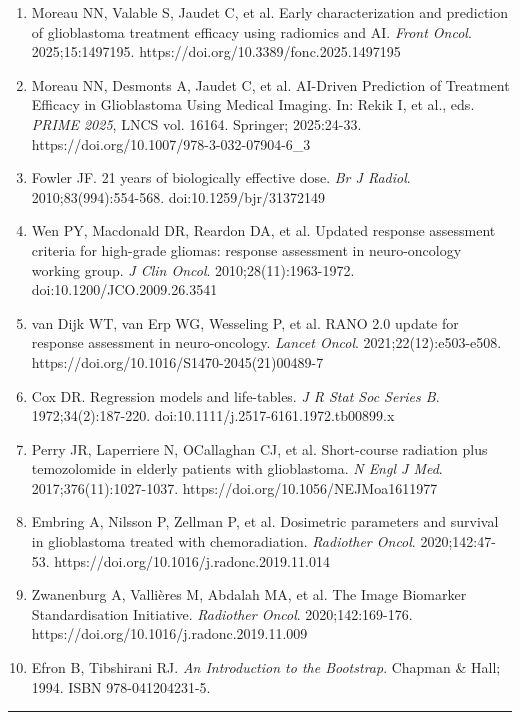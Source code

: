 \documentclass[
  11pt,
]{article}
\begin{document}
\begin{enumerate}
  and radiotherapy plans of patients with glioblastoma: the CFB-GBM
  cohort (Version 3). \emph{The Cancer Imaging Archive}. 2025.
  https://doi.org/10.7937/v9pn-2f72
\item
  Moreau NN, Valable S, Jaudet C, et al. Early characterization and
  prediction of glioblastoma treatment efficacy using radiomics and AI.
  \emph{Front Oncol}. 2025;15:1497195.
  https://doi.org/10.3389/fonc.2025.1497195
\item
  Moreau NN, Desmonts A, Jaudet C, et al. AI-Driven Prediction of
  Treatment Efficacy in Glioblastoma Using Medical Imaging. In: Rekik I,
  et al., eds. \emph{PRIME 2025}, LNCS vol. 16164. Springer; 2025:24-33.
  https://doi.org/10.1007/978-3-032-07904-6\_3
\item
  Fowler JF. 21 years of biologically effective dose. \emph{Br J
  Radiol}. 2010;83(994):554-568. doi:10.1259/bjr/31372149
\item
  Wen PY, Macdonald DR, Reardon DA, et al. Updated response assessment
  criteria for high-grade gliomas: response assessment in neuro-oncology
  working group. \emph{J Clin Oncol}. 2010;28(11):1963-1972.
  doi:10.1200/JCO.2009.26.3541
\item
  van Dijk WT, van Erp WG, Wesseling P, et al. RANO 2.0 update for
  response assessment in neuro-oncology. \emph{Lancet Oncol}.
  2021;22(12):e503-e508. https://doi.org/10.1016/S1470-2045(21)00489-7
\item
  Cox DR. Regression models and life-tables. \emph{J R Stat Soc Series
  B}. 1972;34(2):187-220. doi:10.1111/j.2517-6161.1972.tb00899.x
\item
  Perry JR, Laperriere N, O\textquotesingle Callaghan CJ, et al.
  Short-course radiation plus temozolomide in elderly patients with
  glioblastoma. \emph{N Engl J Med}. 2017;376(11):1027-1037.
  https://doi.org/10.1056/NEJMoa1611977
\item
  Embring A, Nilsson P, Zellman P, et al. Dosimetric parameters and
  survival in glioblastoma treated with chemoradiation. \emph{Radiother
  Oncol}. 2020;142:47-53. https://doi.org/10.1016/j.radonc.2019.11.014
\item
  Zwanenburg A, Vallières M, Abdalah MA, et al. The Image Biomarker
  Standardisation Initiative. \emph{Radiother Oncol}. 2020;142:169-176.
  https://doi.org/10.1016/j.radonc.2019.11.009
\item
  Efron B, Tibshirani RJ. \emph{An Introduction to the Bootstrap}.
  Chapman \& Hall; 1994. ISBN 978-041204231-5.
\end{enumerate}

\begin{center}\rule{0.5\linewidth}{0.5pt}\end{center}
\end{document}
